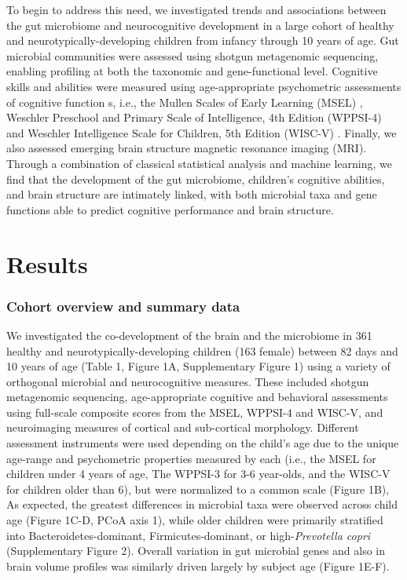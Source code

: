 \documentclass{article}
\begin{document}
To begin to address this need, we investigated trends and associations between
the gut microbiome and
neurocognitive development in a large cohort of healthy and neurotypically-developing
children from infancy through 10 years of age. Gut microbial
communities were assessed using shotgun metagenomic sequencing, enabling
profiling at both the taxonomic and gene-functional level.
Cognitive skills and abilities were measured using age-appropriate
psychometric assessments of cognitive function s, i.e.,
the Mullen Scales of Early Learning (MSEL) \cite{mullenMullenScalesEarly1995},
Weschler Preschool and Primary Scale of Intelligence, 4th Edition (WPPSI-4) 
\cite{wechslerWechslerPreschoolPrimary2012}
and Weschler Intelligence Scale for Children, 5th Edition (WISC-V)
\cite{wechslerWechslerIntelligenceScale1949}.
Finally, we also assessed emerging brain structure magnetic resonance imaging
(MRI). Through a combination of classical statistical analysis and machine
learning, we find that the development of the gut microbiome,
children's cognitive abilities, and brain structure are intimately linked, with
both microbial taxa and gene functions able to predict cognitive
performance and brain structure.

\section*{Results}

\subsubsection*{Cohort overview and summary data}

We investigated the co-development of the brain and the microbiome in
361 healthy and neurotypically-developing children (163 female) between 82 days and 10 years of age
(Table 1,  Figure 1A, Supplementary Figure 1)\cite{forrestAdvancingScienceChildren2018}
using a variety of orthogonal microbial and neurocognitive measures.
These included shotgun metagenomic sequencing,
age-appropriate cognitive and behavioral assessments
using full-scale composite scores from the MSEL, WPPSI-4 and WISC-V,
and neuroimaging measures of cortical and sub-cortical morphology. 
Different assessment instruments were used depending on the child's age
due to the unique age-range and psychometric properties measured by each
(i.e., the MSEL for children under 4 years of age, The WPPSI-3 for 3-6 year-olds,
and the WISC-V for children older than 6), but were normalized to a common scale (Figure 1B),
As expected, the greatest differences in microbial taxa were observed across
child age (Figure 1C-D, PCoA axis 1), while older children were primarily
stratified into Bacteroidetes-dominant, Firmicutes-dominant, or
high-\emph{Prevotella copri} (Supplementary Figure 2). Overall variation
in gut microbial genes and also in brain volume profiles was similarly
driven largely by subject age (Figure 1E-F).
\end{document}

